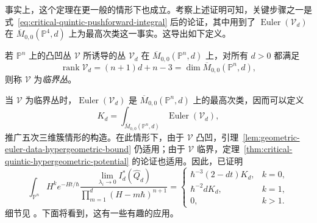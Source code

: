 事实上，这个定理在更一般的情形下也成立。考察上述证明可知，关键步骤之一是式~\eqref{eq:critical-quintic-pushforward-integral} 后的论证，其中用到了 $\operatorname{Euler}(\mathcal V_d)$ 在 $\overline M_{0,0}(\mathbb P^4,d)$ 上为最高次类这一事实。这导出如下定义。
\begin{definition}\label{def:critical-bundle}
若 $\mathbb P^n$ 上的凸凹丛 $\mathcal V$ 所诱导的丛 $\mathcal V_d$ 在 $\overline M_{0,0}(\mathbb P^n,d)$ 上，对所有 $d>0$ 都满足
\[
\operatorname{rank}\mathcal V_d=(n+1)d+n-3=\dim\overline M_{0,0}(\mathbb P^n,d),
\]
则称 $\mathcal V$ 为\emph{临界丛}。
\end{definition}
当 $\mathcal V$ 为临界丛时，$\operatorname{Euler}(\mathcal V_d)$ 是 $\overline M_{0,0}(\mathbb P^n,d)$ 上的最高次类，因而可以定义
\[
K_d=\int_{\overline M_{0,0}(\mathbb P^n,d)}\operatorname{Euler}(\mathcal V_d),
\]
推广五次三维簇情形的构造。在此情形下，由于 $\mathcal V$ 凸凹，引理~\ref{lem:geometric-euler-data-hypergeometric-bound} 仍适用；由于 $\mathcal V$ 临界，定理~\ref{thm:critical-quintic-hypergeometric-potential} 的论证也适用。因此，已证明
\begin{equation}\label{eq:critical-bundle-integral-coefficients}
\int_{\mathbb P^n}H^ke^{-Ht/\hbar}
\frac{\lim_{\lambda_i\to0}I_d^*(\widehat Q_d)}{\prod_{m=1}^d(H-m\hbar)^{n+1}}
=\begin{cases}
\hbar^{-3}(2-dt)K_d,&k=0,\\
\hbar^{-2}dK_d,&k=1,\\
0,&k>1.
\end{cases}
\end{equation}
细节见 。下面将看到，这有一些有趣的应用。

